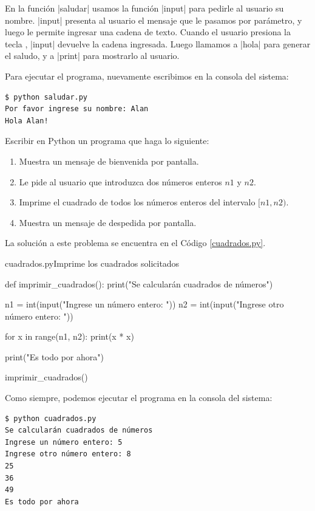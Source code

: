 En la función |saludar| usamos la función |input| para pedirle al usuario su
nombre. |input| presenta al usuario el mensaje que le pasamos por parámetro,
y luego le permite ingresar una cadena de texto. Cuando el usuario presiona la
tecla , |input| devuelve la cadena ingresada. Luego llamamos a
|hola| para generar el saludo, y a |print| para mostrarlo al usuario.

Para ejecutar el programa, nuevamente escribimos en la consola del sistema:

\begin{lstlisting}[numbers=none]
$ python saludar.py
Por favor ingrese su nombre: Alan
Hola Alan!
\end{lstlisting}

\begin{problema}
Escribir en Python un programa que haga lo siguiente:

\begin{enumerate}
\item Muestra un mensaje de bienvenida por pantalla.
\item Le pide al usuario que introduzca dos números enteros $n1$ y $n2$.
\item Imprime el cuadrado de todos los números enteros del intervalo $[n1, n2)$.
\item Muestra un mensaje de despedida por pantalla.
\end{enumerate}
\end{problema}

\begin{solucion}
La solución a este problema se encuentra en el Código \ref{cuadrados.py}.

\begin{codigo}{cuadrados.py}{Imprime los cuadrados solicitados}
\label{cuadrados.py}
\begin{codigo-python}
def imprimir_cuadrados():
    print("Se calcularán cuadrados de números")

    n1 = int(input("Ingrese un número entero: "))
    n2 = int(input("Ingrese otro número entero: "))

    for x in range(n1, n2):
        print(x * x)

    print("Es todo por ahora")

imprimir_cuadrados()
\end{codigo-python}
\end{codigo}

Como siempre, podemos ejecutar el programa en la consola del sistema:

\begin{lstlisting}[numbers=none]
$ python cuadrados.py
Se calcularán cuadrados de números
Ingrese un número entero: 5
Ingrese otro número entero: 8
25
36
49
Es todo por ahora
\end{lstlisting}
\end{solucion}

